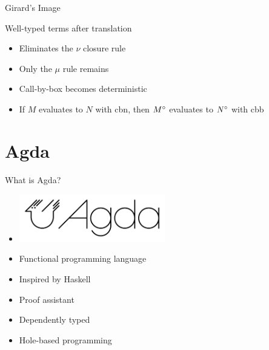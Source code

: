 \documentclass{beamer}
\theoremstyle{definition}
\begin{document}
  \begin{frame}{Girard's Image}
    \begin{block}{Well-typed terms after translation}
      \vspace{7pt}
      \begin{grammar}{
      }
      \end{grammar}
    \end{block} \pause
    \vspace{5pt}
    \begin{itemize}
      \item[\textbullet] Eliminates the \alert{$\nu$} closure rule
      \item[\textbullet] Only the \alert{$\mu$} rule remains
      \item[\textbullet] Call-by-box becomes \alert{deterministic}
      \item[\textbullet] If $M$ evaluates to $N$ with \alert{\textsf{cbn}}, then ${M}^\circ$ evaluates to ${N}^\circ$ with \alert{\textsf{cbb}} 
    \end{itemize}
  \end{frame}

  \section{Agda}

  \begin{frame}{What is Agda?}
    \begin{itemize}
      \item \includegraphics[width=0.5\textwidth]{Agda.png}
      \item[\textbullet] Functional programming language
      \item[\textbullet] Inspired by Haskell
      \item[\textbullet] Proof assistant
      \item[\textbullet] Dependently typed
      \item[\textbullet] Hole-based programming
    \end{itemize}
  \end{frame}
\end{document}
